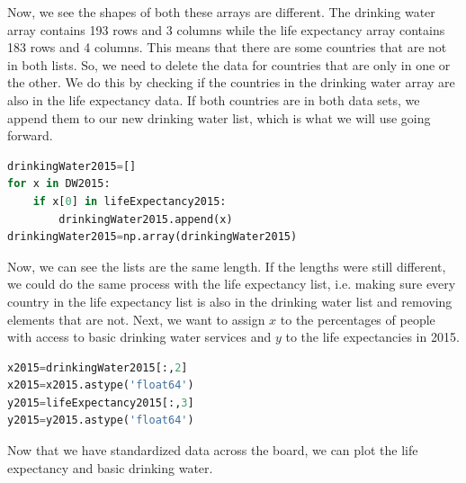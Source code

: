 \documentclass[12pt]{article}
\begin{document}
Now, we see the shapes of both these arrays are different. The drinking water array contains 193 rows and 3 columns while the life expectancy array contains 183 rows and 4 columns. This means that there are some countries that are not in both lists. So, we need to delete the data for countries that are only in one or the other. We do this by checking if the countries in the drinking water array are also in the life expectancy data. If both countries are in both data sets, we append them to our new drinking water list, which is what we will use going forward.
\begin{adjustwidth}{0.5in}{0.25in}
\begin{lstlisting}[language=Python]
drinkingWater2015=[]
for x in DW2015:
    if x[0] in lifeExpectancy2015:
        drinkingWater2015.append(x)
drinkingWater2015=np.array(drinkingWater2015)
\end{lstlisting}
\end{adjustwidth}

Now, we can see the lists are the same length. If the lengths were still different, we could do the same process with the life expectancy list, i.e. making sure every country in the life expectancy list is also in the drinking water list and removing elements that are not. Next, we want to assign $x$ to the percentages of people with access to basic drinking water services and $y$ to the life expectancies in 2015.
\begin{adjustwidth}{0.5in}{0.25in}
\begin{lstlisting}[language=Python]
x2015=drinkingWater2015[:,2]
x2015=x2015.astype('float64')
y2015=lifeExpectancy2015[:,3]
y2015=y2015.astype('float64')
\end{lstlisting}
\end{adjustwidth}

Now that we have standardized data across the board, we can plot the life expectancy and basic drinking water.

\vspace{-130pt}
\end{document}
